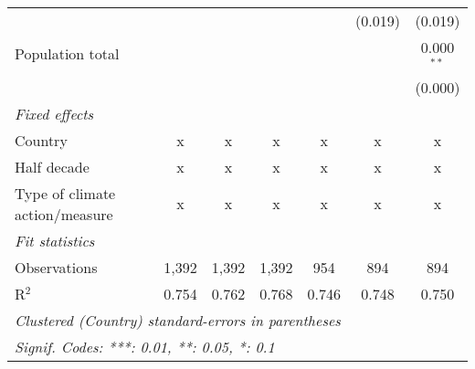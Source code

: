 \begin{tabular}{lcccccc}
                                                                              &         &               &                &                & (0.019)        & (0.019)\\   
   Population total                                                           &         &               &                &                &                & 0.000$^{**}$\\   
                                                                              &         &               &                &                &                & (0.000)\\   
   \emph{Fixed effects}\\
   Country                                                                    & x       & x             & x              & x              & x              & x\\  
   Half decade                                                                & x       & x             & x              & x              & x              & x\\  
   Type of climate action/measure                                             & x       & x             & x              & x              & x              & x\\  
   \midrule \emph{Fit statistics}\\
   Observations                                                               & 1,392   & 1,392         & 1,392          & 954            & 894            & 894\\  
   R$^2$                                                                      & 0.754   & 0.762         & 0.768          & 0.746          & 0.748          & 0.750\\  
   \midrule
   \multicolumn{7}{l}{\emph{Clustered (Country) standard-errors in parentheses}}\\
   \multicolumn{7}{l}{\emph{Signif. Codes: ***: 0.01, **: 0.05, *: 0.1}}\\
\end{tabular}
\par\endgroup


